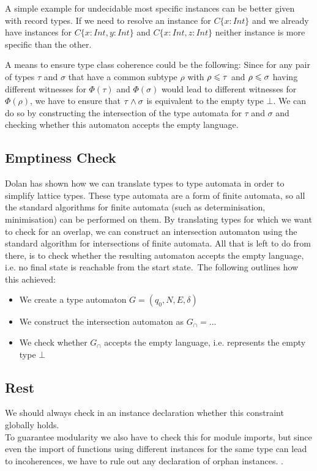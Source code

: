   A simple example for undecidable most specific instances can be better given with record types.
  If we need to resolve an instance for $C \{x : Int\}$ and we already have instances for $C \{x : Int, y : Int\}$ and $C \{x : Int, z : Int\}$ neither instance is more specific than the other.

  
  A means to ensure type class coherence could be the following:
  Since for any pair of types $\tau$ and $\sigma$ that have a common subtype $\rho$ with $\rho \leqslant \tau$ and $\rho \leqslant \sigma$ having different witnesses for $\Phi(\tau)$ and $\Phi(\sigma)$ would lead to different witnesses for $\Phi(\rho)$,
  we have to ensure that $\tau \wedge \sigma$ is equivalent to the empty type $\bot$.
  We can do so by constructing the intersection of the type automata for $\tau$ and $\sigma$ and checking whether this automaton accepts the empty language.

  \subsection{Emptiness Check}

  Dolan \cite{downen2017phd} has shown how we can translate types to type automata in order to simplify lattice types.
  These type automata are a form of finite automata, so all the standard algorithms for finite automata (such as determinisation, minimisation) can be performed on them.
  By translating types for which we want to check for an overlap, we can construct an intersection automaton using the standard algorithm for intersections of finite automata.
  All that is left to do from there, is to check whether the resulting automaton accepts the empty language,  i.e. no final state is reachable from the start state.\
  The following outlines how this achieved:

  \begin{itemize}
    \item We create a type automaton $G = (q_0, N, E, \delta)$
    \item We construct the intersection automaton as $G_\cap = \dots$
    \item We check whether $G_\cap$ accepts the empty language, i.e. represents the empty type $\bot$
  \end{itemize}

  \subsection{Rest}
  We should always check in an instance declaration whether this constraint globally holds. \\
  To guarantee modularity we also have to check this for module imports, but since even the import of functions using different instances for the same type can lead to incoherences, we have to rule out any declaration of orphan instances.
  \cite{Kilpatrick2019-cy}.
